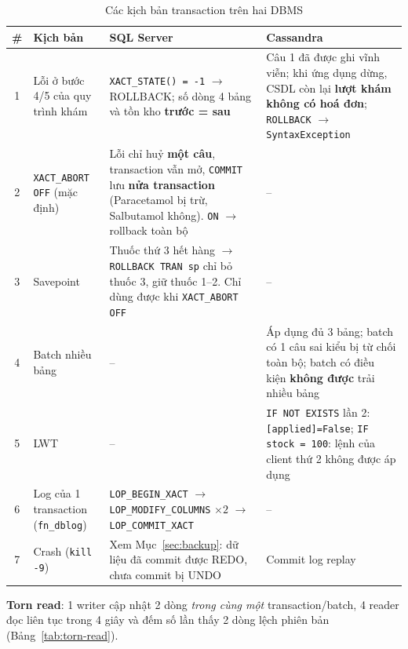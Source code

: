 \begin{table}[H]
\centering
\caption{Các kịch bản transaction trên hai DBMS}
\small
\begin{tabularx}{\linewidth}{|c|p{2.8cm}|X|X|}
\hline
\textbf{\#} & \textbf{Kịch bản} & \textbf{SQL Server} & \textbf{Cassandra} \\ \hline
1 & Lỗi ở bước 4/5 của quy trình khám & \texttt{XACT\_STATE() = -1} $\rightarrow$ ROLLBACK; số dòng 4 bảng và tồn kho \textbf{trước = sau} & Câu 1 đã được ghi vĩnh viễn; khi ứng dụng dừng, CSDL còn lại \textbf{lượt khám không có hoá đơn}; \texttt{ROLLBACK} $\rightarrow$ \texttt{SyntaxException} \\ \hline
2 & \texttt{XACT\_ABORT OFF} (mặc định) & Lỗi chỉ huỷ \textbf{một câu}, transaction vẫn mở, \texttt{COMMIT} lưu \textbf{nửa transaction} (Paracetamol bị trừ, Salbutamol không). \texttt{ON} $\rightarrow$ rollback toàn bộ & -- \\ \hline
3 & Savepoint & Thuốc thứ 3 hết hàng $\rightarrow$ \texttt{ROLLBACK TRAN sp} chỉ bỏ thuốc 3, giữ thuốc 1--2. Chỉ dùng được khi \texttt{XACT\_ABORT OFF} & -- \\ \hline
4 & Batch nhiều bảng & -- & Áp dụng đủ 3 bảng; batch có 1 câu sai kiểu bị từ chối toàn bộ; batch có điều kiện \textbf{không được} trải nhiều bảng \\ \hline
5 & LWT & -- & \texttt{IF NOT EXISTS} lần 2: \texttt{[applied]=False}; \texttt{IF stock = 100}: lệnh của client thứ 2 không được áp dụng \\ \hline
6 & Log của 1 transaction (\texttt{fn\_dblog}) & \texttt{LOP\_BEGIN\_XACT} $\rightarrow$ \texttt{LOP\_MODIFY\_COLUMNS} $\times 2$ $\rightarrow$ \texttt{LOP\_COMMIT\_XACT} & -- \\ \hline
7 & Crash (\texttt{kill -9}) & Xem Mục~\ref{sec:backup}: dữ liệu đã commit được REDO, chưa commit bị UNDO & Commit log replay \\ \hline
\end{tabularx}
\end{table}

\textbf{Torn read}: 1 writer cập nhật 2 dòng \textit{trong cùng một} transaction/batch, 4 reader đọc liên tục trong 4 giây và đếm số lần thấy 2 dòng lệch phiên bản (Bảng~\ref{tab:torn-read}).

